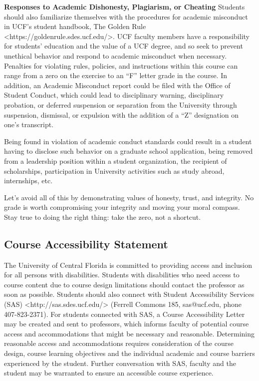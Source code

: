\documentclass[11pt]{article}
\begin{document}
\textbf{Responses to Academic Dishonesty, Plagiarism, or Cheating}
Students should also familiarize themselves with the procedures for academic misconduct in UCF’s student handbook, The Golden Rule <https://goldenrule.sdes.ucf.edu/>. UCF faculty members have a responsibility for students’ education and the value of a UCF degree, and so seek to prevent unethical behavior and respond to academic misconduct when necessary. Penalties for violating rules, policies, and instructions within this course can range from a zero on the exercise to an “F” letter grade in the course. In addition, an Academic Misconduct report could be filed with the Office of Student Conduct, which could lead to disciplinary warning, disciplinary probation, or deferred suspension or separation from the University through suspension, dismissal, or expulsion with the addition of a “Z” designation on one’s transcript.

Being found in violation of academic conduct standards could result in a student having to disclose such behavior on a graduate school application, being removed from a leadership position within a student organization, the recipient of scholarships, participation in University activities such as study abroad, internships, etc.

Let’s avoid all of this by demonstrating values of honesty, trust, and integrity. No grade is worth compromising your integrity and moving your moral compass. Stay true to doing the right thing: take the zero, not a shortcut.

\subsection*{Course Accessibility Statement}

The University of Central Florida is committed to providing access and inclusion for all persons with disabilities. Students with disabilities who need access to course content due to course design limitations should contact the professor as soon as possible. Students should also connect with Student Accessibility Services (SAS) <http://sas.sdes.ucf.edu/> (Ferrell Commons 185, sas@ucf.edu, phone 407-823-2371). For students connected with SAS, a Course Accessibility Letter may be created and sent to professors, which informs faculty of potential course access and accommodations that might be necessary and reasonable. Determining reasonable access and accommodations requires consideration of the course design, course learning objectives and the individual academic and course barriers experienced by the student. Further conversation with SAS, faculty and the student may be warranted to ensure an accessible course experience.
\end{document}
